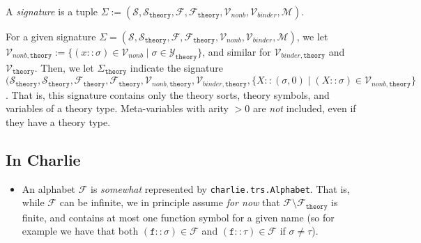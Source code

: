\documentclass{lmcs}
\theoremstyle{theorem}\newtheorem{theorem}{Theorem}
\theoremstyle{theorem}\newtheorem{lemma}[theorem]{Lemma}
\theoremstyle{theorem}\newtheorem{corollary}[theorem]{Corollary}
\theoremstyle{definition}\newtheorem{definition}[theorem]{Definition}
\theoremstyle{definition}\newtheorem{example}[theorem]{Example}
\newcommand{\F}{\mathcal{F}}
\newcommand{\thF}{\mathcal{F}_{\mathtt{theory}}}
\newcommand{\thSigma}{\Sigma_{\mathtt{theory}}}
\newcommand{\thV}{\mathcal{V}_{\mathtt{theory}}}
\newcommand{\M}{\mathcal{M}}
\newcommand{\Vfree}{\mathcal{V}_{\mathit{nonb}}}
\newcommand{\thVfree}{\mathcal{V}_{\mathit{nonb},\mathtt{theory}}}
\newcommand{\Vbound}{\mathcal{V}_{\mathit{binder}}}
\newcommand{\thVbound}{\mathcal{V}_{\mathit{binder},\mathtt{theory}}}
\newcommand{\Sorts}{\mathcal{S}}
\newcommand{\thSorts}{\mathcal{S}_{\mathtt{theory}}}
\newcommand{\thTypes}{\mathcal{Y}_{\mathtt{theory}}}
\newcommand{\atype}{\sigma}
\newcommand{\btype}{\tau}
\newcommand{\identifier}[1]{\mathtt{#1}}
\newcommand{\afun}{\identifier{f}}
\newcommand{\avar}{x}
\newcommand{\Avar}{X}
\newcommand{\charlie}{\textsf{Charlie}\xspace}
\begin{document}
A \emph{signature} is a tuple $\Sigma := (\Sorts,\thSorts,\F,\thF,\Vfree,
\Vbound,\M)$.

For a given signature $\Sigma = (\Sorts,\thSorts,\F,\thF,\Vfree,\Vbound,\M)$,
we let $\thVfree := \{ (\avar :: \atype) \in \Vfree \mid \atype \in \thTypes\}$,
and similar for $\thVbound$ and $\thV$.  Then, we let $\thSigma$ indicate the
signature $(\thSorts,\thSorts,\thF,\thF,\thVfree,\thVbound,
\{ \Avar :: (\atype,0) \mid (\Avar :: \atype) \in \thVfree \}$.  That is, this
signature contains only the theory sorts, theory symbols, and variables of a
theory type. Meta-variables with arity $> 0$ are \emph{not} included, even if
they have a theory type.

\subsection{In \charlie}

\begin{itemize}
\item An alphabet $\F$ is \emph{somewhat} represented by
  \texttt{charlie.trs.Alphabet}.  That is, while $\F$ can be infinite, we in
  principle assume \emph{for now} that $\F \setminus \thF$ is finite, and
  contains at most one function symbol for a given name (so for example we
  have that both $(\afun :: \atype) \in \F$ and $(\afun :: \btype) \in \F$ if
  $\atype \neq \btype$).
\end{itemize}
\end{document}
